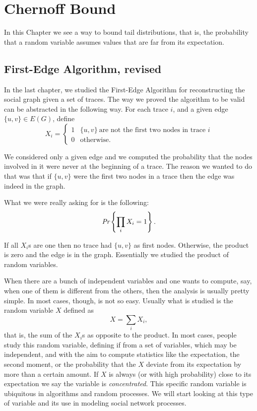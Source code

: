 \chapter{Chernoff Bound}

In this Chapter we see a way to bound tail distributions, that is, the probability that a random variable assumes values that are far from its expectation.

\section{First-Edge Algorithm, revised}
In the last chapter, we studied the First-Edge Algorithm for reconstructing the social graph given a set of traces. The way we proved the algorithm to be valid can be abstracted in the following way. For each trace $i$, and a given edge $\{u,v\} \in E(G)$, define
\begin{equation}
X_i = \begin{cases}
1 & \{u, v\}\ \text{are not the first two nodes in trace } i\\
0 & \text{otherwise}. 
\end{cases}
\end{equation}

We considered only a given edge and we computed the probability that the nodes involved in it were never at the beginning of a trace. The reason we wanted to do that was that if $\{u, v\}$ were the first two nodes in a trace then the edge was indeed in the graph.

What we were really asking for is the following:
\begin{equation}
	\emph{Pr}\left\{\prod_{i} X_i = 1\right\}.
\end{equation}
 
 If all $X_i$s are one then no trace had $\{u,v\}$ as first nodes. Otherwise, the product is zero and the edge is in the graph. Essentially we studied the product of random variables.

When there are a bunch of independent variables and one wants to compute, say, when one of them is different from the others, then the analysis is usually pretty simple. In most cases, though, is not so easy. Usually what is studied is the random variable $X$ defined as
\begin{equation}
	X=\sum_i X_i,
\end{equation}
that is, the sum of the $X_i$s as opposite to the product. In most cases, people study this random variable, defining if from a set of variables, which may be independent, and  with the aim to compute statistics like the expectation, the second moment, or the probability that the $X$ deviate from its expectation by more than a certain amount. If $X$ is always (or with high probability) close to its expectation we say the variable is \emph{concentrated}. This specific random variable is ubiquitous in algorithms and random processes. We will start looking at this type of variable and its use in modeling social network processes.


